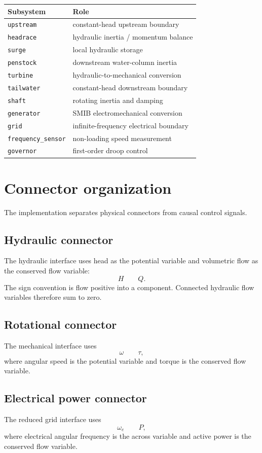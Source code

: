 \documentclass[11pt,a4paper]{article}
\begin{document}
\begin{center}
\begin{tabular}{ll}
\toprule
Subsystem & Role \\
\midrule
\texttt{upstream} & constant-head upstream boundary \\
\texttt{headrace} & hydraulic inertia / momentum balance \\
\texttt{surge} & local hydraulic storage \\
\texttt{penstock} & downstream water-column inertia \\
\texttt{turbine} & hydraulic-to-mechanical conversion \\
\texttt{tailwater} & constant-head downstream boundary \\
\texttt{shaft} & rotating inertia and damping \\
\texttt{generator} & SMIB electromechanical conversion \\
\texttt{grid} & infinite-frequency electrical boundary \\
\texttt{frequency\_sensor} & non-loading speed measurement \\
\texttt{governor} & first-order droop control \\
\bottomrule
\end{tabular}
\end{center}

\section{Connector organization}
The implementation separates physical connectors from causal control signals.

\subsection{Hydraulic connector}
The hydraulic interface uses head as the potential variable and volumetric flow as the conserved flow variable:
\[
H \qquad Q.
\]
The sign convention is flow positive into a component. Connected hydraulic flow variables therefore sum to zero.

\subsection{Rotational connector}
The mechanical interface uses
\[
\omega \qquad \tau,
\]
where angular speed is the potential variable and torque is the conserved flow variable.

\subsection{Electrical power connector}
The reduced grid interface uses
\[
\omega_e \qquad P,
\]
where electrical angular frequency is the across variable and active power is the conserved flow variable.
\end{document}
